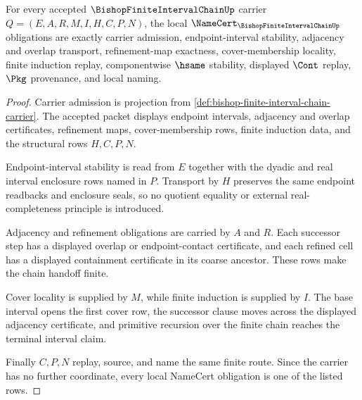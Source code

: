 \begin{theorem}
\label{thm:bishop-finite-interval-chain-namecert-obligations}
For every accepted $\BishopFiniteIntervalChainUp$ carrier $Q=(E,A,R,M,I,H,C,P,N)$, the local $\NameCert_{\BishopFiniteIntervalChainUp}$ obligations are exactly carrier admission, endpoint-interval stability, adjacency and overlap transport, refinement-map exactness, cover-membership locality, finite induction replay, componentwise $\hsame$ stability, displayed $\Cont$ replay, $\Pkg$ provenance, and local naming.
\end{theorem}
\begin{proof}
Carrier admission is projection from \autoref{def:bishop-finite-interval-chain-carrier}. The accepted packet displays endpoint intervals, adjacency and overlap certificates, refinement maps, cover-membership rows, finite induction data, and the structural rows $H,C,P,N$.

Endpoint-interval stability is read from $E$ together with the dyadic and real interval enclosure rows named in $P$. Transport by $H$ preserves the same endpoint readbacks and enclosure seals, so no quotient equality or external real-completeness principle is introduced.

Adjacency and refinement obligations are carried by $A$ and $R$. Each successor step has a displayed overlap or endpoint-contact certificate, and each refined cell has a displayed containment certificate in its coarse ancestor. These rows make the chain handoff finite.

Cover locality is supplied by $M$, while finite induction is supplied by $I$. The base interval opens the first cover row, the successor clause moves across the displayed adjacency certificate, and primitive recursion over the finite chain reaches the terminal interval claim.

Finally $C,P,N$ replay, source, and name the same finite route. Since the carrier has no further coordinate, every local NameCert obligation is one of the listed rows.
\end{proof}

